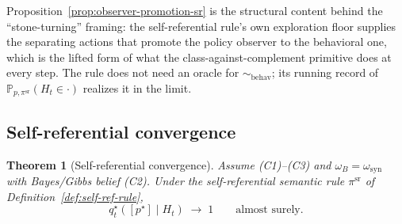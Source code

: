 \documentclass[11pt]{article}
\newtheorem{theorem}{Theorem}[section]
\theoremstyle{definition}
\theoremstyle{remark}
\newcommand{\Prob}{\mathbb{P}}
\begin{document}
Proposition~\ref{prop:observer-promotion-sr} is the structural content behind the ``stone-turning'' framing: the self-referential rule's own exploration floor supplies the separating actions that promote the policy observer to the behavioral one, which is the lifted form of what the class-against-complement primitive does at every step. The rule does not need an oracle for $\sim_{\mathrm{behav}}$; its running record of $\Prob_{p,\pi^{\mathrm{sr}}}(H_t\in\cdot)$ realizes it in the limit.

\subsection{Self-referential convergence}
\label{sec:self-ref-convergence}

\begin{theorem}[Self-referential convergence]
\label{thm:self-ref-convergence}
Assume \textup{(C1)--(C3)} and $\omega_B=\omega_{\mathrm{syn}}$ with Bayes/Gibbs belief \textup{(C2)}. Under the self-referential semantic rule $\pi^{\mathrm{sr}}$ of Definition~\ref{def:self-ref-rule},
\[
q_t^\star([p^\star]\mid H_t)\;\longrightarrow\;1
\qquad\text{almost surely.}
\]
\end{theorem}
\end{document}
